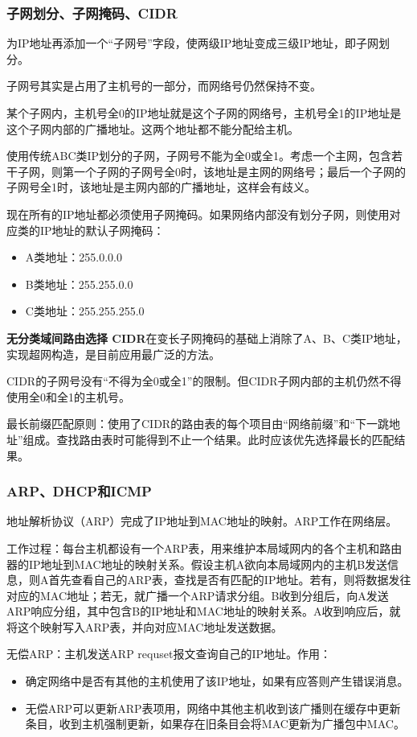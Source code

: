 \documentclass[12pt, a4paper, oneside]{ctexart}
\begin{document}
\subsubsection{子网划分、子网掩码、CIDR}

为IP地址再添加一个“子网号”字段，使两级IP地址变成三级IP地址，即子网划分。

子网号其实是占用了主机号的一部分，而网络号仍然保持不变。

某个子网内，主机号全0的IP地址就是这个子网的网络号，主机号全1的IP地址是这个子网内部的广播地址。这两个地址都不能分配给主机。

使用传统ABC类IP划分的子网，子网号不能为全0或全1。考虑一个主网，包含若干子网，则第一个子网的子网号全0时，该地址是主网的网络号；最后一个子网的子网号全1时，该地址是主网内部的广播地址，这样会有歧义。

现在所有的IP地址都必须使用子网掩码。如果网络内部没有划分子网，则使用对应类的IP地址的默认子网掩码：
\begin{itemize}
    \item A类地址：255.0.0.0
    \item B类地址：255.255.0.0
    \item C类地址：255.255.255.0
\end{itemize}

\textbf{无分类域间路由选择 CIDR}在变长子网掩码的基础上消除了A、B、C类IP地址，实现超网构造，是目前应用最广泛的方法。

CIDR的子网号没有“不得为全0或全1”的限制。但CIDR子网内部的主机仍然不得使用全0和全1的主机号。

最长前缀匹配原则：使用了CIDR的路由表的每个项目由“网络前缀”和“下一跳地址”组成。查找路由表时可能得到不止一个结果。此时应该优先选择最长的匹配结果。

\subsubsection{ARP、DHCP和ICMP}

地址解析协议（ARP）完成了IP地址到MAC地址的映射。ARP工作在网络层。

工作过程：每台主机都设有一个ARP表，用来维护本局域网内的各个主机和路由器的IP地址到MAC地址的映射关系。假设主机A欲向本局域网内的主机B发送信息，则A首先查看自己的ARP表，查找是否有匹配的IP地址。若有，则将数据发往对应的MAC地址；若无，就广播一个ARP请求分组。B收到分组后，向A发送ARP响应分组，其中包含B的IP地址和MAC地址的映射关系。A收到响应后，就将这个映射写入ARP表，并向对应MAC地址发送数据。

无偿ARP：主机发送ARP requset报文查询自己的IP地址。作用：
\begin{itemize}
    \item 确定网络中是否有其他的主机使用了该IP地址，如果有应答则产生错误消息。
    \item 无偿ARP可以更新ARP表项用，网络中其他主机收到该广播则在缓存中更新条目，收到主机强制更新，如果存在旧条目会将MAC更新为广播包中MAC。
\end{itemize}
\end{document}
